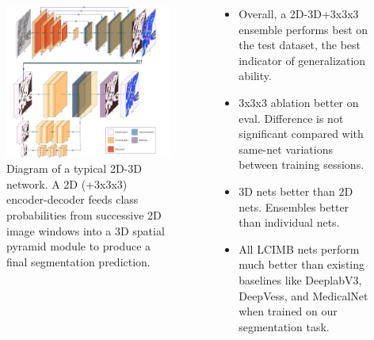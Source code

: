 \documentclass[final]{beamer}
\newlength{\onecolwid}
\newlength{\twocolwid}
\renewcommand{\emph}[1]{{\color{nibib2} #1}}
\begin{document}
\begin{frame}[t]
\begin{columns}[t]
\begin{column}{\twocolwid}
\begin{columns}[t]
\begin{column}{\onecolwid}
\begin{tcolorbox}[title=Methods]
\begin{itemize}
            \end{itemize}
        \end{tcolorbox}
    \begin{center}
        \begin{figure}
        \includegraphics[width=\linewidth]{fig/fullnet-rearranged.png}
        \caption{Diagram of a typical 2D-3D network. A 2D (+3x3x3) encoder-decoder feeds class probabilities from successive 2D image windows into a 3D spatial pyramid module to produce a final segmentation prediction.}
        \end{figure}
    \end{center}
    \end{column}
    \begin{column}{\onecolwid}
    	\begin{tcolorbox}[title=Results]
    	\begin{itemize}
    	\item Overall, a \emph{2D-3D+3x3x3} ensemble performs best on the test dataset, the best indicator of generalization ability. 
    	\item 3x3x3 ablation better on eval. Difference is not significant compared with same-net variations between training sessions.
    	\item 3D nets better than 2D nets. Ensembles better than individual nets.
    	\item All LCIMB nets perform much better than existing baselines like DeeplabV3, DeepVess, and MedicalNet when trained on our segmentation task.
    	\end{itemize}
    	\end{tcolorbox}
    	

\end{column}
\end{columns}
\end{column}
\end{columns}
\end{frame}
\end{document}

